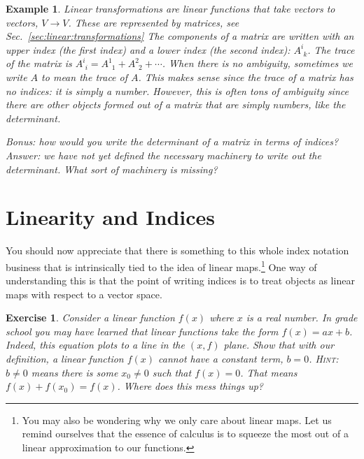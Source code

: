 \documentclass[
  11pt,
	colorful,
	raggedright,
]{tufte-style-thesis-flip}
\newtheorem{exercise}{Exercise}[section]
\newtheorem{example}{Example}[section]
\begin{document}
\begin{example}
Linear transformations are linear functions that take vectors to vectors, $V\to V$. These are represented by matrices, see Sec.~\ref{sec:linear:transformations} The components of a matrix are written with an upper index (the first index) and a lower index (the second index): $A^i_{\phantom ik}$. The trace of the matrix is $A^i_{\phantom ii} = A^1_{\phantom 11} + A^2_{\phantom 22} + \cdots$. When there is no ambiguity, sometimes we write $A$ to mean the trace of $A$. This makes sense since the trace of a matrix has no indices: it is simply a number. However, this is often tons of ambiguity since there are other objects formed out of a matrix that are simply numbers, like the determinant. 

Bonus: how would you write the determinant of a matrix in terms of indices? Answer: we have not yet defined the necessary machinery to write out the determinant. What sort of machinery is missing? 
\end{example}


\section{Linearity and Indices}

You should now appreciate that there is something to this whole index notation business that is intrinsically tied to the idea of linear maps.\footnote{You may also be wondering why we only care about linear maps. Let us remind ourselves that the essence of calculus is to squeeze the most out of a linear approximation to our functions.} One way of understanding this is that the point of writing indices is to treat objects as linear maps with respect to a vector space. 

\begin{exercise}
Consider a linear function $f(x)$ where $x$ is a real number. In grade school you may have learned that linear functions take the form $f(x)= ax+b$. Indeed, this equation plots to a line in the $(x,f)$ plane. Show that with our definition, a linear function $f(x)$ cannot have a constant term, $b=0$. \textsc{Hint}: $b\neq 0$ means there is some $x_0 \neq 0$ such that $f(x)=0$. That means $f(x)+f(x_0) = f(x)$. Where does this mess things up?
\end{exercise}
\end{document}
